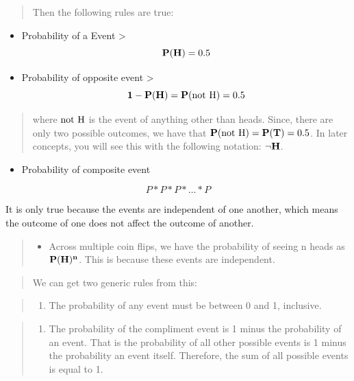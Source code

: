 \documentclass[]{book}
\providecommand{\tightlist}{%
  \setlength{\itemsep}{0pt}\setlength{\parskip}{0pt}}
\begin{document}
\begin{quote}
Then the following rules are true:
\end{quote}

\begin{itemize}
\item
  Probability of a Event \textgreater{} \[\bold{P(H)} = 0.5\]
\item
  Probability of opposite event \textgreater{}
  \[\bold{1 - P(H) = P(\text{not H})} = 0.5\]
\end{itemize}

\begin{quote}
where \(\bold{\text{not H}}\) is the event of anything other than heads.
Since, there are only two possible outcomes, we have that
\(\bold{P(\text{not H}) = P(T)} = 0.5\). In later concepts, you will see
this with the following notation: \(\bold{\lnot H}\).
\end{quote}

\begin{itemize}
\tightlist
\item
  Probability of composite event
\end{itemize}

\[ P * P * P * \dots * P \]

It is only true because the events are independent of one another, which
means the outcome of one does not affect the outcome of another.

\begin{quote}
\begin{itemize}
\tightlist
\item
  Across multiple coin flips, we have the probability of seeing n heads
  as \(\bold{P(H)^n}\). This is because these events are independent.
\end{itemize}
\end{quote}

\begin{quote}
We can get two generic rules from this:
\end{quote}

\begin{quote}
\begin{enumerate}
\def\labelenumi{\arabic{enumi}.}
\tightlist
\item
  The probability of any event must be between 0 and 1, inclusive.
\end{enumerate}
\end{quote}

\begin{quote}
\begin{enumerate}
\def\labelenumi{\arabic{enumi}.}
\setcounter{enumi}{1}
\tightlist
\item
  The probability of the compliment event is 1 minus the probability of
  an event. That is the probability of all other possible events is 1
  minus the probability an event itself. Therefore, the sum of all
  possible events is equal to 1.
\end{enumerate}
\end{quote}
\end{document}
